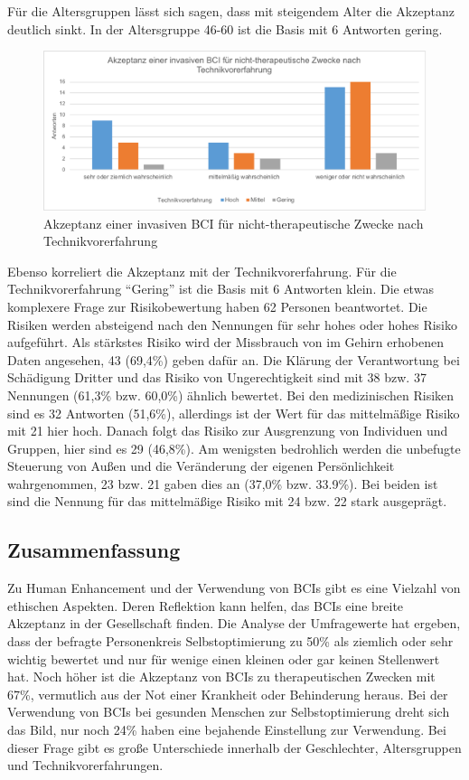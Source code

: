 \documentclass[11pt,ngerman,parskip=half]{scrartcl}
\begin{document}
Für die Altersgruppen lässt sich sagen, dass mit steigendem Alter die
Akzeptanz deutlich sinkt. In der Altersgruppe 46-60 ist die Basis mit 6
Antworten gering.

\begin{figure}[H]
  \centering
  \includegraphics[width=1.0\textwidth]{src/img/kathrin5.png}
  \caption{Akzeptanz einer invasiven BCI für nicht-therapeutische Zwecke nach
  Technikvorerfahrung}
  \label{img:kathrin5}
\end{figure}

Ebenso korreliert die Akzeptanz mit der Technikvorerfahrung. Für die
Technikvorerfahrung \enquote{Gering} ist die Basis mit 6 Antworten klein.
Die etwas komplexere Frage zur Risikobewertung haben 62 Personen beantwortet.
Die Risiken werden absteigend nach den Nennungen für sehr hohes oder hohes
Risiko aufgeführt. Als stärkstes Risiko wird der Missbrauch von im Gehirn
erhobenen Daten angesehen, 43 (69,4\%) geben dafür an. Die Klärung der
Verantwortung bei Schädigung Dritter und das Risiko von Ungerechtigkeit sind
mit 38 bzw. 37 Nennungen (61,3\% bzw. 60,0\%) ähnlich bewertet. Bei den
medizinischen Risiken sind es 32 Antworten (51,6\%), allerdings ist der Wert
für das mittelmäßige Risiko mit 21 hier hoch. Danach folgt das Risiko zur
Ausgrenzung von Individuen und Gruppen, hier sind es 29 (46,8\%). Am wenigsten
bedrohlich werden die unbefugte Steuerung von Außen und die Veränderung der
eigenen Persönlichkeit wahrgenommen, 23 bzw. 21 gaben dies an (37,0\% bzw.
33.9\%). Bei beiden ist sind die Nennung für das mittelmäßige Risiko mit 24
bzw. 22 stark ausgeprägt.

\subsection{Zusammenfassung}
\label{subsec:kathrin_zusammenfassung}
Zu Human Enhancement und der Verwendung von BCIs gibt es eine Vielzahl von
ethischen Aspekten. Deren Reflektion kann helfen, das BCIs eine breite
Akzeptanz in der Gesellschaft finden. Die Analyse der Umfragewerte hat
ergeben, dass der befragte Personenkreis Selbstoptimierung zu 50\% als
ziemlich oder sehr wichtig bewertet und nur für wenige einen kleinen oder gar
keinen Stellenwert hat. Noch höher ist die Akzeptanz von BCIs zu
therapeutischen Zwecken mit 67\%, vermutlich aus der Not einer Krankheit oder
Behinderung heraus. Bei der Verwendung von BCIs bei gesunden Menschen zur
Selbstoptimierung dreht sich das Bild, nur noch 24\% haben eine bejahende
Einstellung zur Verwendung. Bei dieser Frage gibt es große Unterschiede
innerhalb der Geschlechter, Altersgruppen und Technikvorerfahrungen.

\newpage
\printbibliography[heading=bibintoc]
\end{document}
